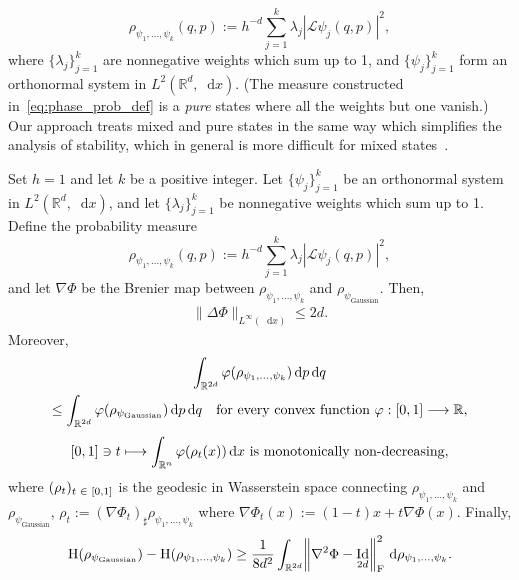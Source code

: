 \documentclass[AHL,Unicode,longabstracts]{cedram}
\newcommand{\R}{\mathbb R}
\DeclareMathOperator{\Id}{Id}
\newcommand{\Ent}{\mathrm H}
\newcommand{\dd}{n}
\newcommand{\prob}{\rho}
\newcommand*\diff{\mathop{}\!\mathrm{d}}
\newcommand{\cotrans}{\mathcal L}
\newcommand{\OT}{\Phi}
\newcommand{\wave}{\psi}
\newcommand{\waveg}{\psi_{\mathrm{Gaussian}}}
\newcommand{\cxfun}{\varphi}
\renewcommand*{\to}{\mathchoice{\longrightarrow}{\rightarrow}{\rightarrow}{\rightarrow}}
\let\oldmapsto\mapsto
\renewcommand*{\mapsto}{\mathchoice{\longmapsto}{\oldmapsto}{\oldmapsto}{\oldmapsto}}
\let\originalleft\left
\let\originalright\right
\renewcommand{\left}{\mathopen{}\mathclose\bgroup\originalleft}
\renewcommand{\right}{\aftergroup\egroup\originalright}
\let\oldin\in
\renewcommand{\in}{\mathchoice{\oldin}{\oldin}{\,\oldin\,}{\,\oldin\,}}
\begin{document}
\begin{equation}\label{eq:mixed}
\prob_{\wave_1,\ldots,\wave_k}(q,p):=h^{-d}\sum_{j=1}^k\lambda_j|\cotrans \wave_j(q,p)|^2,
\end{equation}
where $\{\lambda_j\}_{j=1}^k$ are nonnegative weights which sum up to 1, and $\{\wave_j\}_{j=1}^k$ form an orthonormal system in $L^2(\R^d,\diff x)$. (The measure constructed in~\eqref{eq:phase_prob_def} is a \emph{pure} states where all the weights but one vanish.) Our approach treats mixed and pure states in the same way which simplifies the analysis of stability, which in general is more difficult for mixed states~\cite{frank2023generalized}.


\begin{theo}\label{thm:generalized_Wehrl_conjecture}
Set $h=1$ and let $k$ be a positive integer. Let $\{\wave_j\}_{j=1}^k$ be an orthonormal system in $L^2(\R^d,\diff x)$, and let $\{\lambda_j\}_{j=1}^k$ be nonnegative weights which sum up to 1. Define the probability measure
\[
\prob_{\wave_1,\ldots,\wave_k}(q,p):=h^{-d}\sum_{j=1}^k\lambda_j|\cotrans \wave_j(q,p)|^2,
\]
and let $\nabla\OT$ be the Brenier map between $\prob_{\wave_1,\ldots,\wave_k}$ and $\prob_{\waveg}$. Then,
\begin{align}\label{eq:infty_bound_Wehrl}
\|\Delta\OT\|_{L^{\infty}(\diff x)}\le 2d.
\end{align}
Moreover,
\begin{multline}\label{eq:majorization_Wehrl}
\int_{\R^{2d}} \cxfun(\prob_{\wave_1,\ldots,\wave_k})\diff p\diff q\\
\le \int_{\R^{2d}} \cxfun\left(\prob_{\waveg}\right)\diff p\diff q\quad\text{for every convex function }\varphi:[0,1] \to \R,
\end{multline}
\begin{equation}\label{eq:mono_geo_Wehrl}
[0,1]\ni t\mapsto \int_{\R^{\dd}}\cxfun(\prob_t(x))\diff x\textnormal{ is monotonically non-decreasing},
\end{equation}
where $(\prob_t)_{t\in [0,1]}$ is the geodesic in Wasserstein space connecting $\prob_{\wave_1,\ldots,\wave_k}$ and\linebreak $\prob_{\waveg}$, $\prob_t:=(\nabla\OT_t)_{\sharp}\prob_{\wave_1,\ldots,\wave_k}$ where $\nabla\OT_t(x):=(1-t)x+t\nabla\OT(x)$. Finally,
\begin{align}\label{eq:entropy_stability_Wehrl}
\Ent\left(\prob_{\waveg}\right)- \Ent\left(\prob_{\wave_1,\ldots,\wave_k}\right) \ge \frac{1}{8d^2}\int_{\R^{2d}}\left\|\nabla^2\OT-\Id_{2d}\right\|_{\text{F}}^2\,\diff \prob_{\wave_1,\ldots,\wave_k}.
\end{align}
\end{theo}
\end{document}

